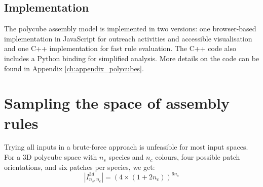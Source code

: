\subsection{Implementation}

The polycube assembly model is implemented in two versions: one browser-based implementation in JavaScript for outreach activities and accessible visualisation and one C++ implementation for fast rule evaluation. The C++ code also includes a Python binding for simplified analysis. More details on the code can be found in Appendix \ref{ch:appendix_polycubes}.




\section{Sampling the space of assembly rules}
Trying all inputs in a brute-force approach is unfeasible for most input spaces. For a 3D polycube space with \(n_s\) species and \(n_c\) colours, four possible patch orientations, and six patches per species, we get: 
\[
\left\lvert I_{n_s, n_c}^{3d}\right\rvert = (4 \times (1+2n_c))^{6n_s}
\]

